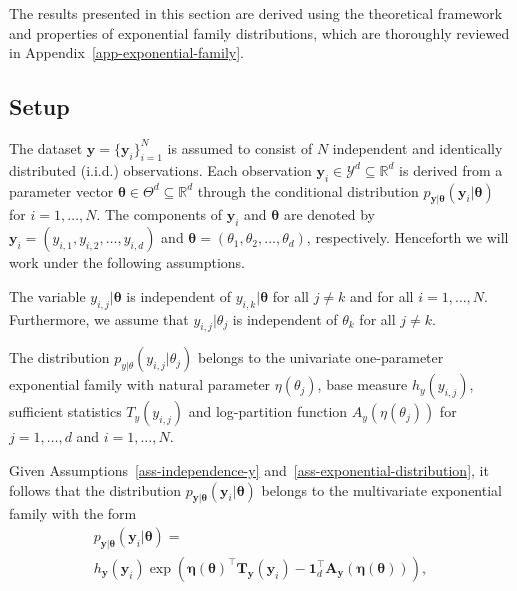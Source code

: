 The results presented in this section are derived using the theoretical framework and properties of exponential family distributions, which are thoroughly reviewed in Appendix~\ref{app-exponential-family}. 

\subsection{Setup}
The dataset $\mathbf{y} = \{ \boldsymbol{y}_i \}_{i=1}^N$ is assumed to consist of $N$ independent and identically distributed (i.i.d.) observations. Each observation $\boldsymbol{y}_i \in \mathcal{Y}^d \subseteq \mathbb{R}^d$ is derived from a parameter vector $\boldsymbol{\theta} \in \Theta^d \subseteq \mathbb{R}^d$ through the conditional distribution $p_{\boldsymbol{y} \vert \boldsymbol{\theta}}(\boldsymbol{y}_i \vert \boldsymbol{\theta})$ for $i = 1, \ldots, N$. 
The components of $\boldsymbol{y}_i$ and $\boldsymbol{\theta}$ are denoted by $\boldsymbol{y}_i = (y_{i,1}, y_{i,2}, \ldots, y_{i,d})$ and $\boldsymbol{\theta} = (\theta_1, \theta_2, \ldots, \theta_d)$, respectively. 
Henceforth we will work under the following assumptions. 
\begin{assumption}
\label{ass-independence-y}
The variable $y_{i,j}|\boldsymbol{\theta}$ is independent of $y_{i,k}|\boldsymbol{\theta}$ for all $j \neq k$ and for all $i = 1, \ldots, N$. Furthermore, we assume that $y_{i,j}| \theta_j$ is independent of $\theta_{k}$ for all $j \neq k$.
\end{assumption}
\begin{assumption}
\label{ass-exponential-distribution}
The distribution $p_{{y} \vert {\theta}}(y_{i,j} \vert {\theta}_j)$ belongs to the univariate one-parameter exponential family with natural parameter $\eta(\theta_j)$, base measure $h_{y}(y_{i,j})$, sufficient statistics $T_{y}(y_{i,j})$ and log-partition function $A_y(\eta(\theta_j))$ for $j = 1, \ldots, d$ and $i = 1, \ldots, N$.
\end{assumption}
Given Assumptions~\ref{ass-independence-y} and~\ref{ass-exponential-distribution}, it follows that the distribution $p_{\boldsymbol{y} \vert \boldsymbol{\theta}}(\boldsymbol{y}_i \vert \boldsymbol{\theta})$ belongs to the multivariate exponential family with the form
\begin{multline*}
p_{\boldsymbol{y}\vert\boldsymbol{\theta}}(\boldsymbol{y}_i \vert \boldsymbol{\theta}) =\\  h_{\boldsymbol{y}}(\boldsymbol{y}_i)   \exp \left( \boldsymbol{\eta}(\boldsymbol{\theta})^{\top} \mathbf{T}_{\boldsymbol{y}}(\boldsymbol{y}_i) - \mathbf{1}_d^\top \mathbf{A}_{\boldsymbol{y}}(\boldsymbol{\eta}(\boldsymbol{\theta})) \right),
\end{multline*}
